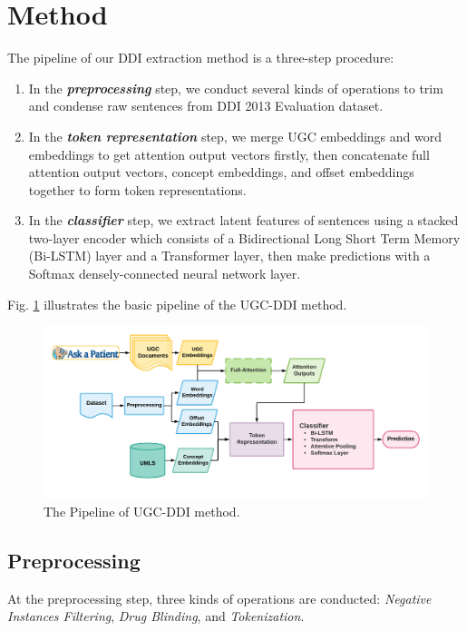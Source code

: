 \documentclass[conference]{IEEEtran}
\begin{document}
\section{Method}
\label{sec:method}

The pipeline of our DDI extraction method is a three-step procedure:

\begin{enumerate}
	\item In the \emph{\textbf{preprocessing}} step, we conduct several kinds of operations to trim and condense raw sentences from DDI 2013 Evaluation dataset.
	\item In the \emph{\textbf{token representation}} step, we merge UGC embeddings and word embeddings to get attention output vectors
	firstly, then concatenate full attention output vectors, concept embeddings, and offset embeddings together to form token representations.
	\item In the \emph{\textbf{classifier}} step, we extract latent features of sentences using a stacked
	two-layer encoder which consists of a Bidirectional Long Short Term Memory (Bi-LSTM) layer and a Transformer layer,
	then make predictions with a Softmax densely-connected neural network layer.
\end{enumerate}

Fig. \ref{fig:pipeline} illustrates the basic pipeline of the UGC-DDI method.

\begin{figure}[ht]
	\centering
	\includegraphics[scale=0.75]{figures/flow-chart-lite}
	\caption{The Pipeline of UGC-DDI method.}
	\label{fig:pipeline}
\end{figure}

\subsection{Preprocessing}

At the preprocessing step, three kinds of operations are conducted: \emph{Negative Instances Filtering}, 
\emph{Drug Blinding}, and \emph{Tokenization}.
\end{document}
